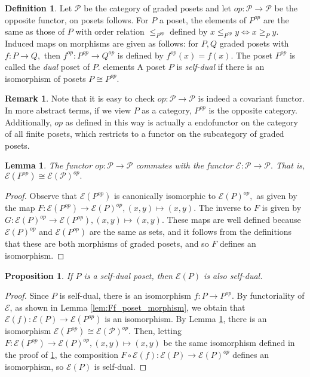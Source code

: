 \documentclass[10 pt]{amsart}
\theoremstyle{plain}
\newtheorem{prop}[thm]{Proposition}
\newtheorem{lem}[thm]{Lemma}
\theoremstyle{definition}
\newtheorem{defn}[thm]{Definition}
\newtheorem{rem}[thm]{Remark}
\theoremstyle{remark}
\numberwithin{equation}{section}
\renewcommand{\iff}{\Leftrightarrow}
\begin{document}
\begin{defn}
Let $\mathcal P$ be the category of graded posets and let $op:\mathcal P \rightarrow \mathcal P$ be the opposite functor, on posets follows. For $P$ a poset, the elements of $P^{op}$ are the same as those of $P$ with order relation $\le_{P^{op}}$ defined by $x \leq_{P^{op}} y \iff x \geq_P y.$ Induced maps on morphisms are given as follows: for $P,Q$ graded posets with $f:P \rightarrow Q,$ then $f^{op}:P^{op} \rightarrow Q^{op}$ is defined by $f^{op}(x) = f(x).$ The poset $P^{op}$ is called the {\it dual} poset of $P$. elements A poset $P$ is {\it self-dual} if there is an isomorphism of posets $P \cong P^{op}.$
\end{defn}

\begin{rem}
Note that it is easy to check $op:\mathcal P \rightarrow \mathcal P$ is indeed a covariant functor. In more abstract terms, if we view $P$ as a category, $P^{op}$ is the opposite category. Additionally, $op$ as defined in this way is actually a endofunctor on the category of all finite posets, which restricts to a functor on the subcategory of graded posets.
\end{rem}

\begin{lem}
\label{lem:commuting_op_e}
The functor $op:\mathcal P \rightarrow \mathcal P$ commutes with the functor $\mathcal E:\mathcal P \rightarrow \mathcal P.$ That is, $\mathcal E(P^{op}) \cong \mathcal E(\mathcal P)^{op}.$
\end{lem}
\begin{proof}
Observe that $\mathcal E(P^{op})$ is canonically isomorphic to $\mathcal E(P)^{op},$ as given by the map $F:\mathcal E(P^{op}) \rightarrow \mathcal E(P)^{op},(x,y) \mapsto (x,y).$ The inverse to $F$ is given by $G:\mathcal E(P)^{op} \rightarrow \mathcal E(P^{op}),(x,y)\mapsto (x,y).$ These maps are well defined because $\mathcal E(P)^{op}$ and $\mathcal E(P^{op})$ are the same as sets, and it follows from the definitions that these are both morphisms of graded posets, and so $F$ defines an isomorphism.
\end{proof}

\begin{prop}
\label{prop:self_dual_preservation}
If $P$ is a self-dual poset, then $\mathcal E(P)$ is also self-dual.
\end{prop}
\begin{proof}
Since $P$ is self-dual, there is an isomorphism $f:P \rightarrow P^{op}.$ By functoriality of $\mathcal E$, as shown in Lemma \ref{lem:Ff_poset_morphism}, we obtain that $\mathcal E(f):\mathcal E(P) \rightarrow \mathcal E(P^{op})$ is an isomorphism. By Lemma \ref{lem:commuting_op_e}, there is an isomorphism $\mathcal E(P^{op}) \cong \mathcal E(\mathcal P)^{op}.$ Then, letting $F:\mathcal E(P^{op}) \rightarrow \mathcal E(P)^{op},(x,y) \mapsto (x,y)$ be the same isomorphism defined in the proof of
\ref{lem:commuting_op_e}, the composition $F\circ \mathcal E(f):\mathcal E(P) \rightarrow \mathcal E(P)^{op}$ defines an isomorphism, so $\mathcal E(P)$ is self-dual.
\end{proof}
\end{document}
